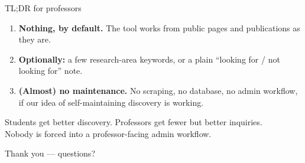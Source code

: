 \documentclass[11pt,aspectratio=169]{beamer}
\begin{document}
\begin{frame}{TL;DR for professors}
  \begin{enumerate}
    \item \textbf{Nothing, by default.} The tool works from public pages
      and publications as they are.
    \item \textbf{Optionally:} a few research-area keywords, or a plain
      ``looking for / not looking for'' note.
    \item \textbf{(Almost) no maintenance.} No scraping, no database, no admin workflow, if our idea of self-maintaining discovery is working.
  \end{enumerate}
  \vspace{0.6em}
  \begin{center}
    \alert{Students get better discovery. Professors get fewer but better inquiries.\\
    Nobody is forced into a professor-facing admin workflow.}
  \end{center}
\end{frame}

\begin{frame}[standout]
  Thank you --- questions?
\end{frame}
\end{document}
